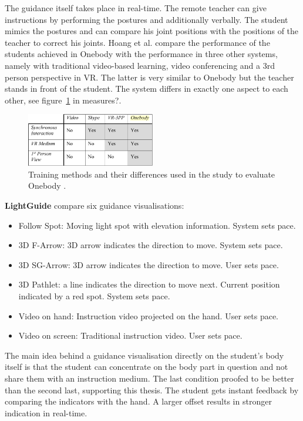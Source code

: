 The guidance itself takes place in real-time. The remote teacher can give instructions by performing the postures and additionally verbally. The student mimics the postures and can compare his joint positions with the positions of the teacher to correct his joints. Hoang et al. compare the performance of the students achieved in Onebody with the performance in three other systems, namely with traditional video-based learning, video conferencing and a 3rd person perspective in VR. The latter is very similar to Onebody but the teacher stands in front of the student. The system differs in exactly one aspect to each other, see figure~\ref{fig:ob2} \todo in measures?.
\begin{figure}
	\centering
	\includegraphics[width=0.5\textwidth]{img/onebody_training_methods.PNG}
	\caption{Training methods and their differences used in the study to evaluate Onebody \cite{Hoang2016}.}
	\label{fig:ob2}
\end{figure}
\textbf{LightGuide} \cite{Sodhi2012} compare six guidance visualisations:
\begin{itemize}
	\item Follow Spot: Moving light spot with elevation information. System sets pace.
	\item 3D F-Arrow: 3D arrow indicates the direction to move. System sets pace.
	\item 3D SG-Arrow: 3D arrow indicates the direction to move. User sets pace.
	\item 3D Pathlet: a line indicates the direction to move next. Current position indicated by a red spot. System sets pace.
	\item Video on hand: Instruction video projected on the hand. User sets pace.
	\item Video on screen: Traditional instruction video. User sets pace.
\end{itemize}
The main idea behind a guidance visualisation directly on the student's body itself is that the student can concentrate on the body part in question and not share them with an instruction medium. The last condition proofed to be better than the second last, supporting this thesis.
The student gets instant feedback by comparing the indicators with the hand. A larger offset results in stronger indication in real-time.\\ \\

